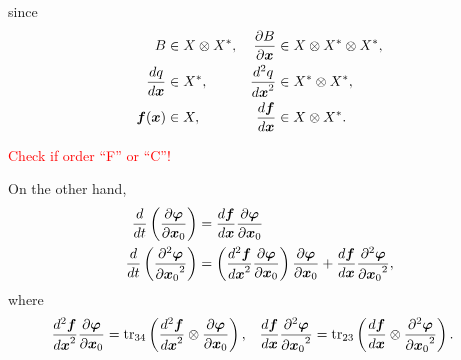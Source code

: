 \documentclass[a4paper]{article}
\newcommand{\deriv}[3][1]{%
    \ifthenelse{\equal{#1}{1}}{\frac{d #2}{d #3}}{\frac{d^#1 #2}{{d #3}^#1}}
}
\newcommand{\pderiv}[3][1]{%
    \ifthenelse{\equal{#1}{1}}{\frac{\partial #2}{\partial #3}}{\frac{\partial^#1 #2}{{\partial #3}^#1}}
}
\newcommand{\parens}[1]{\left(#1\right)}
\newcommand{\tr}{\mathop{\mathrm{tr}}\nolimits}
\newcommand{\traj}{\bm \varphi}
\newcommand{\red}[1]{\textcolor{red}{#1}}
\begin{document}
since
\begin{align}
    \begin{aligned}
        B &\in X \otimes X^* ,&
        \pderiv{B}{\bm x} &\in X \otimes X^* \otimes X^*,\\
        \deriv{q}{\bm x}&\in X^*, &
        \deriv[2]{q}{\bm x} & \in X^* \otimes X^*,\\
        \bm f(\bm x) &\in X, &
        \deriv{\bm f}{\bm x} &\in X \otimes X^*.
    \end{aligned}
\end{align}

\red{Check if order ``F'' or ``C''!}

On the other hand,
\begin{align}
    \deriv{}{t}
    \parens{\pderiv{\traj}{\bm x_0}}
    &= \deriv{\bm f}{\bm x} \pderiv{\traj}{\bm x_0}\\
    \deriv{}{t}
    \parens{\pderiv[2]{\traj}{\bm x_0}}
    &=
    \parens{\deriv[2]{\bm f}{\bm x} \pderiv{\traj}{\bm x_0}}
    \pderiv{\traj}{\bm x_0}
    +
    \deriv{\bm f}{\bm x} \pderiv[2]{\traj}{\bm x_0},
\end{align}
where
\begin{align}
    \begin{aligned}
        \deriv[2]{\bm f}{\bm x} \pderiv{\traj}{\bm x_0}
        &= \tr_{34} \parens{
            \deriv[2]{\bm f}{\bm x} \otimes \pderiv{\traj}{\bm x_0}
        },
        &
        \deriv{\bm f}{\bm x} \pderiv[2]{\traj}{\bm x_0}
        &=
        \tr_{23} \parens{
            \deriv{\bm f}{\bm x} \otimes \pderiv[2]{\traj}{\bm x_0}
        }.
    \end{aligned}
\end{align}
\end{document}
